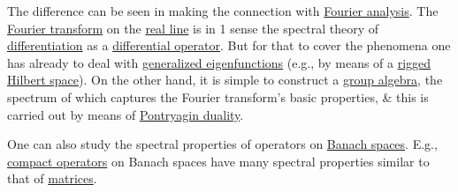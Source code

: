\documentclass{article}
\begin{document}
The difference can be seen in making the connection with \href{https://en.wikipedia.org/wiki/Fourier_analysis}{Fourier analysis}. The \href{https://en.wikipedia.org/wiki/Fourier_transform}{Fourier transform} on the \href{https://en.wikipedia.org/wiki/Real_line}{real line} is in 1 sense the spectral theory of \href{https://en.wikipedia.org/wiki/Derivative}{differentiation} as a \href{https://en.wikipedia.org/wiki/Differential_operator}{differential operator}. But for that to cover the phenomena one has already to deal with \href{https://en.wikipedia.org/wiki/Generalized_eigenfunction}{generalized eigenfunctions} (e.g., by means of a \href{https://en.wikipedia.org/wiki/Rigged_Hilbert_space}{rigged Hilbert space}). On the other hand, it is simple to construct a \href{https://en.wikipedia.org/wiki/Group_algebra_of_a_locally_compact_group}{group algebra}, the spectrum of which captures the Fourier transform's basic properties, \& this is carried out by means of \href{https://en.wikipedia.org/wiki/Pontryagin_duality}{Pontryagin duality}.

One can also study the spectral properties of operators on \href{https://en.wikipedia.org/wiki/Banach_spaces}{Banach spaces}. E.g., \href{https://en.wikipedia.org/wiki/Compact_operator}{compact operators} on Banach spaces have many spectral properties similar to that of \href{https://en.wikipedia.org/wiki/Matrix_(mathematics)}{matrices}.
\end{document}
